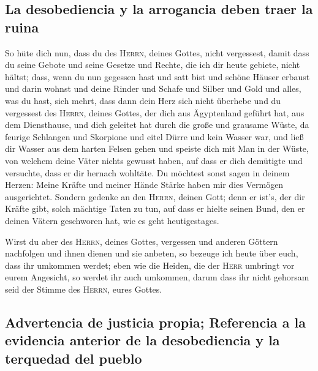 \hypertarget{la-desobediencia-y-la-arrogancia-deben-traer-la-ruina}{%
\subsection{La desobediencia y la arrogancia deben traer la
ruina}\label{la-desobediencia-y-la-arrogancia-deben-traer-la-ruina}}

 So hüte dich nun, dass du des \textsc{Herrn}, deines
Gottes, nicht vergessest, damit dass du seine Gebote und seine Gesetze
und Rechte, die ich dir heute gebiete, nicht hältst; 
dass, wenn du nun gegessen hast und satt bist und schöne Häuser erbaust
und darin wohnst  und deine Rinder und Schafe und Silber
und Gold und alles, was du hast, sich mehrt,  dass dann
dein Herz sich nicht überhebe und du vergessest des \textsc{Herrn},
deines Gottes, der dich aus Ägyptenland geführt hat, aus dem
Diensthause,  und dich geleitet hat durch die große und
grausame Wüste, da feurige Schlangen und Skorpione und eitel Dürre und
kein Wasser war, und ließ dir Wasser aus dem harten Felsen gehen
 und speiste dich mit Man in der Wüste, von welchem deine
Väter nichts gewusst haben, auf dass er dich demütigte und versuchte,
dass er dir hernach wohltäte.  Du möchtest sonst sagen in
deinem Herzen: Meine Kräfte und meiner Hände Stärke haben mir dies
Vermögen ausgerichtet.  Sondern gedenke an den
\textsc{Herrn}, deinen Gott; denn er ist's, der dir Kräfte gibt, solch
mächtige Taten zu tun, auf dass er hielte seinen Bund, den er deinen
Vätern geschworen hat, wie es geht heutigestages.

 Wirst du aber des \textsc{Herrn}, deines Gottes,
vergessen und anderen Göttern nachfolgen und ihnen dienen und sie
anbeten, so bezeuge ich heute über euch, dass ihr umkommen werdet;
 eben wie die Heiden, die der \textsc{Herr} umbringt vor
eurem Angesicht, so werdet ihr auch umkommen, darum dass ihr nicht
gehorsam seid der Stimme des \textsc{Herrn}, eures Gottes.

\hypertarget{advertencia-de-justicia-propia-referencia-a-la-evidencia-anterior-de-la-desobediencia-y-la-terquedad-del-pueblo}{%
\subsection{Advertencia de justicia propia; Referencia a la evidencia
anterior de la desobediencia y la terquedad del
pueblo}\label{advertencia-de-justicia-propia-referencia-a-la-evidencia-anterior-de-la-desobediencia-y-la-terquedad-del-pueblo}}


